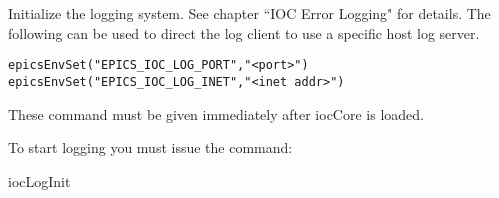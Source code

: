 Initialize the logging system. See chapter ``IOC Error Logging" for details. The following can be used to direct the log 
client to use a specific host log server.

\begin{verbatim}epicsEnvSet("EPICS_IOC_LOG_PORT","<port>")
epicsEnvSet("EPICS_IOC_LOG_INET","<inet addr>")
\end{verbatim}These command must be given immediately after iocCore is loaded.

To start logging you must issue the command:

iocLogInit








